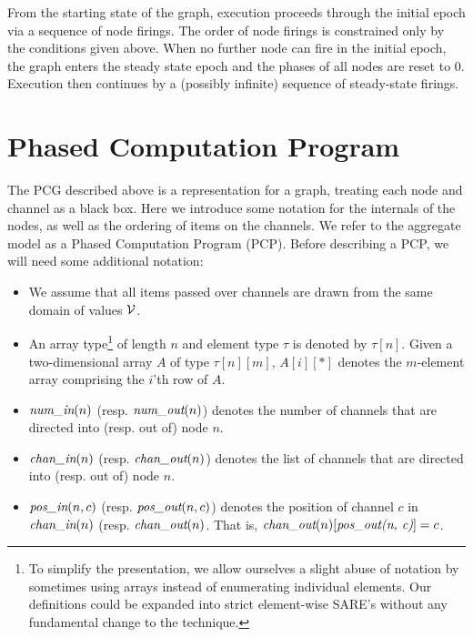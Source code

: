 From the starting state of the graph, execution proceeds through the
initial epoch via a sequence of node firings.  The order of node
firings is constrained only by the conditions given above.  When no
further node can fire in the initial epoch, the graph enters the
steady state epoch and the phases of all nodes are reset to 0.
Execution then continues by a (possibly infinite) sequence of
steady-state firings.

\section{Phased Computation Program}

The PCG described above is a representation for a graph, treating each
node and channel as a black box.  Here we introduce some notation for
the internals of the nodes, as well as the ordering of items on the
channels.  We refer to the aggregate model as a Phased Computation
Program (PCP).  Before describing a PCP, we will need some additional
notation:
\begin{itemize}

\item We assume that all items passed over channels are drawn from the
same domain of values ${\cal V}$.

\item An array type\footnote{To simplify the presentation, we allow
ourselves a slight abuse of notation by sometimes using arrays instead
of enumerating individual elements.  Our definitions could be expanded
into strict element-wise SARE's without any fundamental change to the
technique.} of length $n$ and element type $\tau$ is denoted by
$\tau[n]$.  Given a two-dimensional array $A$ of type $\tau[n][m]$,
$A[i][*]$ denotes the $m$-element array comprising the $i$'th row of
$A$.

\item $\mbox{\it num\_in}(n)$ (resp. $\mbox{\it num\_out}(n)$) denotes the number of
channels that are directed into (resp. out of) node $n$.

\item $\mbox{\it chan\_in}(n)$ (resp. $\mbox{\it chan\_out}(n)$) denotes the list of
channels that are directed into (resp. out of) node $n$.

\item $\mbox{\it pos\_in}(n, c)$ (resp. $\mbox{\it pos\_out}(n, c)$) denotes the
position of channel $c$ in $\mbox{\it chan\_in}(n)$
(resp. $\mbox{\it chan\_out}(n)$.  That is, $\mbox{\it chan\_out}(n)[\mbox{\it pos\_out(n,
c)}] = c$.

\end{itemize}

